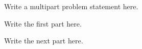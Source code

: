 \begin{problem}
Write a multipart problem statement here.
\end{problem}

\begin{problempart}
Write the first part here.
\end{problempart}

\begin{solution}
\end{solution}

\begin{problempart}
Write the next part here.
\end{problempart}

\begin{solution}
\end{solution}
